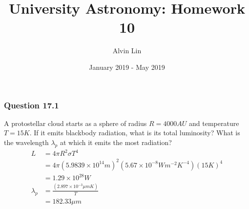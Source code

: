 \documentclass{math}
\title{University Astronomy: Homework 10}
\author{Alvin Lin}
\date{January 2019 - May 2019}
\begin{document}
\maketitle

\subsubsection*{Question 17.1}
A protostellar cloud starts as a sphere of radius \( R = 4000 AU \) and
temperature \( T = 15K \). If it emits blackbody radiation, what is its total
luminosity? What is the wavelength \( \lambda_p \) at which it emits the most
radiation?
\begin{align*}
  L &= 4\pi R^2\sigma T^4 \\
  &= 4\pi(5.9839\times10^{14}m)^2(5.67\times10^{-8}Wm^{-2}K^{-4})(15K)^4 \\
  &= 1.29\times10^{28}W \\
  \lambda_p &= \frac{(2.897\times10^{-3}\mu mK)}{T} \\
  &= 182.33\mu m
\end{align*}
\end{document}
